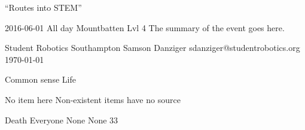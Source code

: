 \documentclass{riskassessment}
\begin{document}
\activityname
    {``Routes into STEM''} %

\activitydetails
    {2016-06-01}    %
    {All day}       %
    {Mountbatten Lvl 4} %
    {The summary of the event goes here.} %

\assessmentdetails
    {Student Robotics Southampton}  %
    {Samson Danziger}               %
    {sdanziger@studentrobotics.org} %
    {\today}                        %

\begin{referencelist}
    \item
        {Common sense}  %
        {Life}          %

    \item
        {No item here}
        {Non-existent items have no source}
\end{referencelist}

\begin{risklist}
    \item
        {Death}     %
        {Everyone}  %
        {None}      %
        {None}      %
        {3}{3}      %
\end{risklist}
\end{document}
